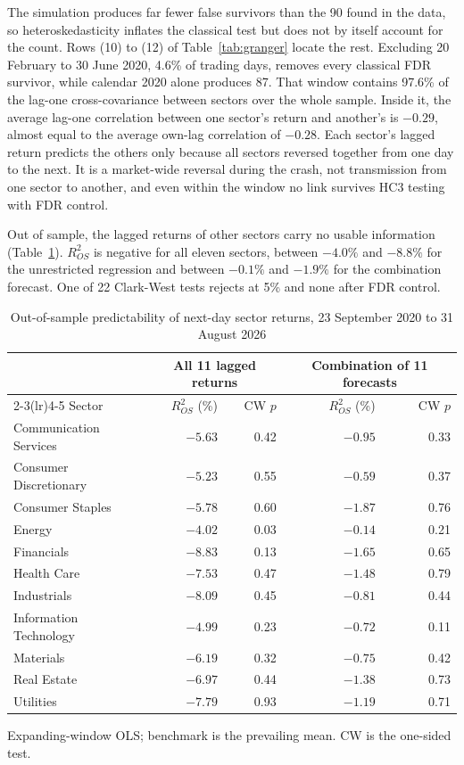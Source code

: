 \documentclass[11pt]{article}
\begin{document}
The simulation produces far fewer false survivors than the 90 found in the data, so heteroskedasticity inflates the classical test but does not by itself account for the count. Rows (10) to (12) of Table~\ref{tab:granger} locate the rest. Excluding 20 February to 30 June 2020, 4.6\% of trading days, removes every classical FDR survivor, while calendar 2020 alone produces 87. That window contains 97.6\% of the lag-one cross-covariance between sectors over the whole sample. Inside it, the average lag-one correlation between one sector's return and another's is $-0.29$, almost equal to the average own-lag correlation of $-0.28$. Each sector's lagged return predicts the others only because all sectors reversed together from one day to the next. It is a market-wide reversal during the crash, not transmission from one sector to another, and even within the window no link survives HC3 testing with FDR control.

Out of sample, the lagged returns of other sectors carry no usable information (Table~\ref{tab:oos}). $R^2_{OS}$ is negative for all eleven sectors, between $-4.0\%$ and $-8.8\%$ for the unrestricted regression and between $-0.1\%$ and $-1.9\%$ for the combination forecast. One of 22 Clark-West tests rejects at 5\% and none after FDR control.

\begin{table}[H]
\centering
\caption{Out-of-sample predictability of next-day sector returns, 23 September 2020 to 31 August 2026}
\label{tab:oos}
\small
\begin{tabular}{lrrrr}
\toprule
& \multicolumn{2}{c}{All 11 lagged returns} & \multicolumn{2}{c}{Combination of 11 forecasts} \\
\cmidrule(lr){2-3}\cmidrule(lr){4-5}
Sector & $R^2_{OS}$ (\%) & CW $p$ & $R^2_{OS}$ (\%) & CW $p$ \\
\midrule
Communication Services & $-5.63$ & 0.42 & $-0.95$ & 0.33 \\
Consumer Discretionary & $-5.23$ & 0.55 & $-0.59$ & 0.37 \\
Consumer Staples & $-5.78$ & 0.60 & $-1.87$ & 0.76 \\
Energy & $-4.02$ & 0.03 & $-0.14$ & 0.21 \\
Financials & $-8.83$ & 0.13 & $-1.65$ & 0.65 \\
Health Care & $-7.53$ & 0.47 & $-1.48$ & 0.79 \\
Industrials & $-8.09$ & 0.45 & $-0.81$ & 0.44 \\
Information Technology & $-4.99$ & 0.23 & $-0.72$ & 0.11 \\
Materials & $-6.19$ & 0.32 & $-0.75$ & 0.42 \\
Real Estate & $-6.97$ & 0.44 & $-1.38$ & 0.73 \\
Utilities & $-7.79$ & 0.93 & $-1.19$ & 0.71 \\
\bottomrule
\end{tabular}

\smallskip
\parbox{0.95\textwidth}{\footnotesize Expanding-window OLS; benchmark is the prevailing mean. CW is the one-sided \citet{clark2007} test.}
\end{table}
\end{document}
